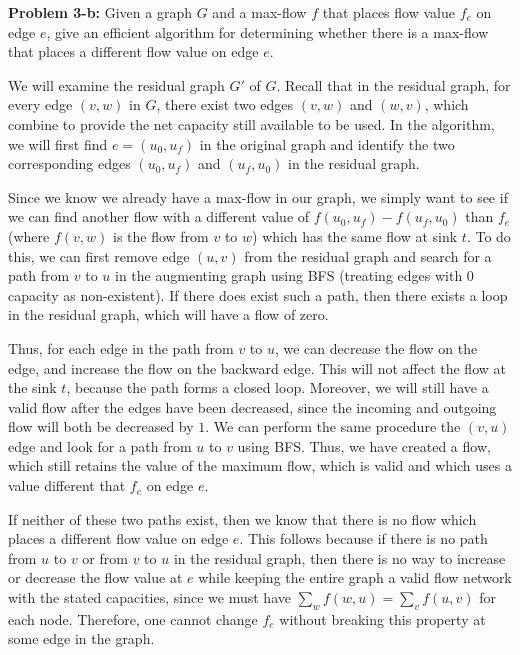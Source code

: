\documentclass[psamsfonts]{amsart}
\newenvironment{sol}{\vspace{0.25cm}{\large \bfseries Solution:}}{\qedsymbol}
\newenvironment{prob}[1]{\begin{framed}{\large \bfseries Problem #1:}}{\end{framed}}
\begin{document}
\begin{prob}{3-b}
Given a graph $G$ and a max-flow $f$ that places flow value $f_e$ on edge $e$, give an efficient algorithm for determining whether there is a max-flow that places a different flow value on edge $e$.
\end{prob}
\begin{sol}
We will examine the residual graph $G'$ of $G$. Recall that in the residual graph, for every edge $(v,w)$ in $G$, there exist two edges $(v,w)$ and $(w,v)$, which combine to provide the net capacity still available to be used. In the algorithm, we will first find $e = (u_0, u_f)$ in the original graph and identify the two corresponding edges $(u_0, u_f)$ and $(u_f, u_0)$ in the residual graph.

Since we know we already have a max-flow in our graph, we simply want to see if we can find another flow with a different value of $f(u_0,u_f) - f(u_f, u_0)$ than $f_e$ (where $f(v,w)$ is the flow from $v$ to $w$) which has the same flow at sink $t$. To do this, we can first remove edge $(u,v)$ from the residual graph and search for a path from $v$ to $u$ in the augmenting graph using BFS (treating edges with 0 capacity as non-existent). If there does exist such a path, then there exists a loop in the residual graph, which will have a flow of zero. 

Thus, for each edge in the path from $v$ to $u$, we can decrease the flow on the edge, and increase the flow on the backward edge. This will not affect the flow at the sink $t$, because the path forms a closed loop. Moreover, we will still have a valid flow after the edges have been decreased, since the incoming and outgoing flow will both be decreased by $1$. We can perform the same procedure the $(v,u)$ edge and look for a path from $u$ to $v$ using BFS. Thus, we have created a flow, which still retains the value of the maximum flow, which is valid and which uses a value different that $f_e$ on edge $e$. 

If neither of these two paths exist, then we know that there is no flow which places a different flow value on edge $e$. This follows because if there is no path from $u$ to $v$ or from $v$ to $u$ in the residual graph, then there is no way to increase or decrease the flow value at $e$ while keeping the entire graph a valid flow network with the stated capacities, since we must have $\sum_w f(w,u) = \sum_v f(u,v)$ for each node. Therefore, one cannot change $f_e$ without breaking this property at some edge in the graph.
\end{sol}
\end{document}
